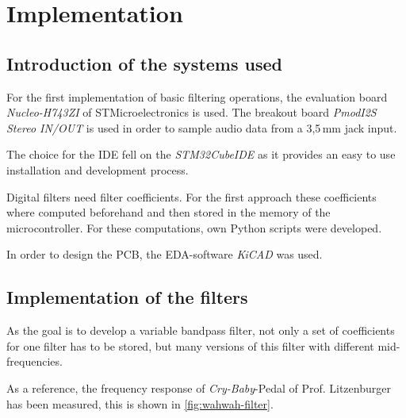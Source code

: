 \section{Implementation}

\subsection{Introduction of the systems used}

For the first implementation of basic filtering operations, the evaluation board \textit{Nucleo-H743ZI} of STMicroelectronics
is used. The breakout board \textit{PmodI2S Stereo IN/OUT} is used in order to sample audio data from a 3,5\,mm jack input.

The choice for the \ac{IDE} fell on the
\newline \textit{STM32CubeIDE} as it provides an easy to use installation and
development process.

Digital filters need filter coefficients. For the first approach these
coefficients where computed beforehand and then stored in the memory of the microcontroller. For these computations,
own Python scripts were developed.

In order to design the \ac{PCB}, the \ac{EDA}-software \textit{KiCAD} was used.

\subsection{Implementation of the filters}

As the goal is to develop a variable bandpass filter, not only a set of coefficients for one filter has to be stored,
but many versions of this filter with different mid-frequencies.

As a reference, the frequency response of \textit{Cry-Baby}-Pedal of Prof. Litzenburger has been measured, this is
shown in \autoref{fig:wahwah-filter}.

